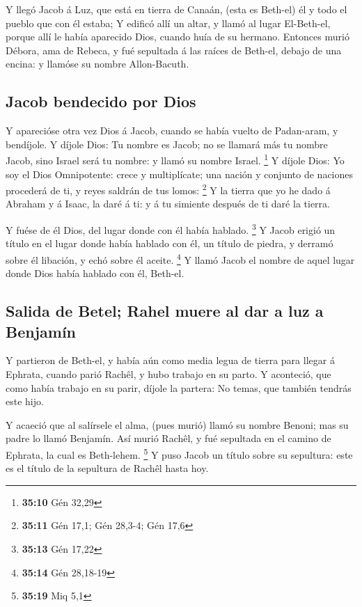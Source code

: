  Y llegó Jacob á Luz, que está en tierra de Canaán, (esta es
Beth-el) él y todo el pueblo que con él estaba;  Y edificó
allí un altar, y llamó al lugar El-Beth-el, porque allí le había
aparecido Dios, cuando huía de su hermano.  Entonces murió
Débora, ama de Rebeca, y fué sepultada á las raíces de Beth-el, debajo
de una encina: y llamóse su nombre Allon-Bacuth.

\hypertarget{jacob-bendecido-por-dios}{%
\subsection{Jacob bendecido por Dios}\label{jacob-bendecido-por-dios}}

 Y aparecióse otra vez Dios á Jacob, cuando se había vuelto
de Padan-aram, y bendíjole.  Y díjole Dios: Tu nombre es
Jacob; no se llamará más tu nombre Jacob, sino Israel será tu nombre: y
llamó su nombre Israel. \footnote{\textbf{35:10} Gén 32,29}
 Y díjole Dios: Yo soy el Dios Omnipotente: crece y
multiplícate; una nación y conjunto de naciones procederá de ti, y reyes
saldrán de tus lomos: \footnote{\textbf{35:11} Gén 17,1; Gén 28,3-4; Gén
  17,6}  Y la tierra que yo he dado á Abraham y á Isaac, la
daré á ti: y á tu simiente después de ti daré la tierra.

 Y fuése de él Dios, del lugar donde con él había hablado.
\footnote{\textbf{35:13} Gén 17,22}  Y Jacob erigió un
título en el lugar donde había hablado con él, un título de piedra, y
derramó sobre él libación, y echó sobre él aceite. \footnote{\textbf{35:14}
  Gén 28,18-19}  Y llamó Jacob el nombre de aquel lugar
donde Dios había hablado con él, Beth-el.

\hypertarget{salida-de-betel-rahel-muere-al-dar-a-luz-a-benjamuxedn}{%
\subsection{Salida de Betel; Rahel muere al dar a luz a
Benjamín}\label{salida-de-betel-rahel-muere-al-dar-a-luz-a-benjamuxedn}}

 Y partieron de Beth-el, y había aún como media legua de
tierra para llegar á Ephrata, cuando parió Rachêl, y hubo trabajo en su
parto.  Y aconteció, que como había trabajo en su parir,
díjole la partera: No temas, que también tendrás este hijo.

 Y acaeció que al salírsele el alma, (pues murió) llamó su
nombre Benoni; mas su padre lo llamó Benjamín.  Así murió
Rachêl, y fué sepultada en el camino de Ephrata, la cual es Beth-lehem.
\footnote{\textbf{35:19} Miq 5,1}  Y puso Jacob un título
sobre su sepultura: este es el título de la sepultura de Rachêl hasta
hoy.

